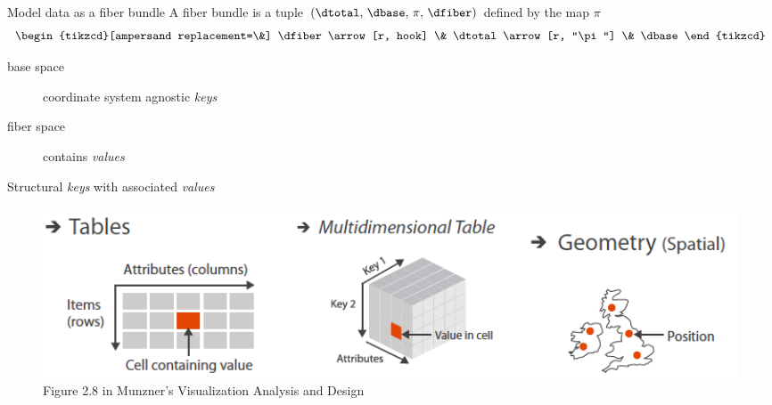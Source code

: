 \documentclass[xcolor={dvipsnames}, handout]{beamer}
\begin{document}
\begin{frame}{Model data as a fiber bundle \cite{butlerVectorBundleClassesForm1992,butlerVisualizationModelBased1989}}
    A fiber bundle is a tuple $(\dtotal,\,\dbase,\,\pi ,\,\dfiber)$ defined by the map $\pi$
    \begin{equation}
        \label{eq:fiber_bundle}
        \begin{tikzcd}[ampersand replacement=\&]
            \dfiber \arrow[r, hook] \& \dtotal \arrow[r, "\pi"] \& \dbase
        \end{tikzcd}
    \end{equation}
    \begin{description}
        \item[base space \dbase] coordinate system agnostic \textit{keys}
        \item[fiber space \dfiber] contains \textit{values}    
    \end{description}
    \begin{block}{Structural \textit{keys} with associated \textit{values} \cite{munznerVisualizationAnalysisDesign2014}}
        \begin{figure}
            \includegraphics[width=1\textwidth]{figures/intro/munzner_datatypes.png}
            \caption{Figure 2.8 in Munzner's Visualization Analysis and Design\cite{munznerVisualizationAnalysisDesign2014}}
        \end{figure}
    \end{block} 


\end{frame}
\end{document}
